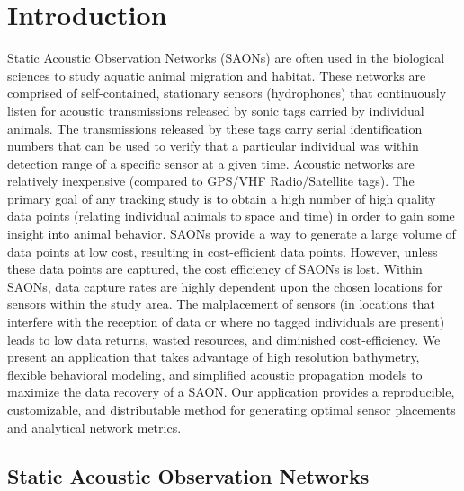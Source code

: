 \chapter{Introduction}
Static Acoustic Observation Networks (SAONs) are often used in the biological sciences to study aquatic animal migration and habitat.  These networks are comprised of self-contained, stationary sensors (hydrophones) that continuously listen for acoustic transmissions released by sonic tags carried by individual animals.  The transmissions released by these tags carry serial identification numbers that can be used to verify that a particular individual was within detection range of a specific sensor at a given time.  Acoustic networks are relatively inexpensive (compared to GPS/VHF Radio/Satellite tags).  The primary goal of any tracking study is to obtain a high number of high quality data points (relating individual animals to space and time) in order to gain some insight into animal behavior.  SAONs provide a way to generate a large volume of data points at low cost, resulting in cost-efficient data points.  However, unless these data points are captured, the cost efficiency of SAONs is lost.  Within SAONs, data capture rates are highly dependent upon the chosen locations for sensors within the study area.  The malplacement of sensors (in locations that interfere with the reception of data or where no tagged individuals are present) leads to low data returns, wasted resources, and diminished cost-efficiency.  We present an application that takes advantage of high resolution bathymetry, flexible behavioral modeling, and simplified acoustic propagation models to maximize the data recovery of a SAON.  Our application provides a reproducible, customizable, and distributable method for generating optimal sensor placements and analytical network metrics.




\section{Static Acoustic Observation Networks}
